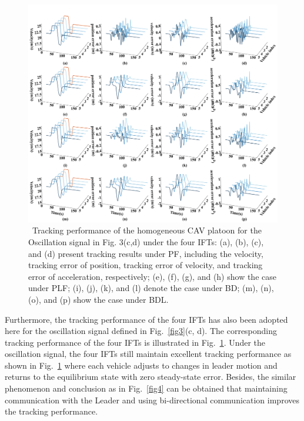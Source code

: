 \documentclass[a4paper]{cas-sc}
\begin{document}
\begin{figure}

  \centering
  \includegraphics[width=14cm]{figs/fig5.png}
  \caption{~Tracking performance of the homogeneous CAV platoon for the Oscillation signal in Fig. 3(c,d) under the four IFTs: (a), (b), (c), and (d) present tracking results under PF, including the velocity, tracking error of position, tracking error of velocity, and tracking error of acceleration, respectively; (e), (f), (g), and (h) show the case under PLF; (i), (j), (k), and (l) denote the case under BD; (m), (n), (o), and (p) show the case under BDL.}
  \label{fig5}
\end{figure}

Furthermore, the tracking performance of the four IFTs has also been adopted here for the oscillation signal defined in Fig.~\ref{fig3}(c, d). The corresponding tracking performance of the four IFTs is illustrated in Fig.~\ref{fig5}. Under the oscillation signal, the four IFTs still maintain excellent tracking performance as shown in Fig.~\ref{fig5} where each vehicle adjusts to changes in leader motion and returns to the equilibrium state with zero steady-state error. Besides, the similar phenomenon and conclusion as in Fig.~\ref{fig4} can be obtained that maintaining communication with the Leader and using bi-directional communication improves the tracking performance.
\end{document}
